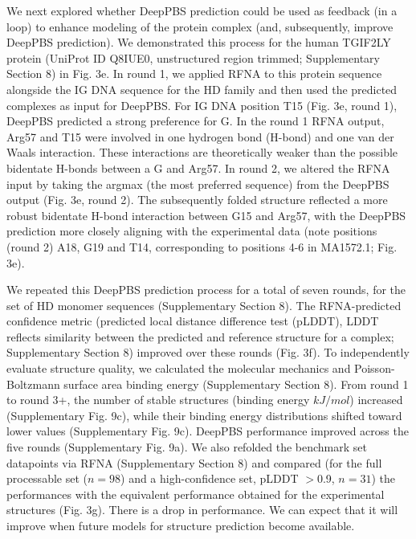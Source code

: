 \par
We next explored whether DeepPBS prediction could be used as feedback (in a loop) to enhance modeling of the protein complex (and, subsequently, improve DeepPBS prediction). We demonstrated this process for the human TGIF2LY protein (UniProt ID Q8IUE0, unstructured region trimmed; Supplementary Section 8) in Fig. 3e. In round 1, we applied RFNA to this protein sequence alongside the IG DNA sequence for the HD family and then used the predicted complexes as input for DeepPBS. For IG DNA position T15 (Fig. 3e, round 1), DeepPBS predicted a strong preference for G. In the round 1 RFNA output, Arg57 and T15 were involved in one hydrogen bond (H-bond) and one van der Waals interaction. These interactions are theoretically weaker than the possible bidentate H-bonds between a G and Arg57. In round 2, we altered the RFNA input by taking the argmax (the most preferred sequence) from the DeepPBS output (Fig. 3e, round 2). The subsequently folded structure reflected a more robust bidentate H-bond interaction between G15 and Arg57, with the DeepPBS prediction more closely aligning with the experimental data (note positions (round 2) A18, G19 and T14, corresponding to positions 4-6 in MA1572.1; Fig. 3e).
\par
We repeated this DeepPBS prediction process for a total of seven rounds, for the set of HD monomer sequences (Supplementary Section 8). The RFNA-predicted confidence metric (predicted local distance difference test (pLDDT), LDDT \citep{Mariani2013} reflects similarity between the predicted and reference structure for a complex; Supplementary Section 8) improved over these rounds (Fig. 3f). To independently evaluate structure quality, we calculated the molecular mechanics and Poisson-Boltzmann surface area \citep{Genheden2015} binding energy (Supplementary Section 8). From round 1 to round 3+, the number of stable structures (binding energy $kJ/mol$) increased (Supplementary Fig. 9c), while their binding energy distributions shifted toward lower values (Supplementary Fig. 9c). DeepPBS performance improved across the five rounds (Supplementary Fig. 9a). We also refolded the benchmark set datapoints via RFNA (Supplementary Section 8) and compared (for the full processable set ($n=98$) and a high-confidence set, pLDDT $>$0.9, $n=31$) the performances with the equivalent performance obtained for the experimental structures (Fig. 3g). There is a drop in performance. We can expect that it will improve when future models for structure prediction become available.
\par
